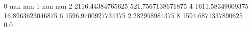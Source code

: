 0 nan nan
1 nan nan
2 2116.44384765625 521.7567138671875
4 1611.58349609375 16.8963623046875
6 1596.9700927734375 2.282958984375
8 1594.6871337890625 0.0
